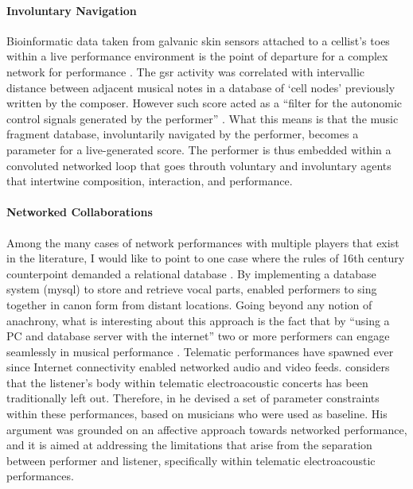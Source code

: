 \paragraph{Involuntary Navigation}
Bioinformatic data taken from galvanic skin sensors attached to a cellist's toes within a live performance environment is the point of departure for a complex network for performance \parencite{icmc/bbp2372.2006.123}. The \gls{gsr} activity was correlated with intervallic distance between adjacent musical notes in a database of `cell nodes' previously written by the composer. However such score acted as a ``filter for the autonomic control signals generated by the performer'' \parencite[601]{icmc/bbp2372.2006.123}. What this means is that the music fragment database, involuntarily navigated by the performer, becomes a parameter for a live-generated score. The performer is thus embedded within a convoluted networked loop that goes throuth voluntary and involuntary agents that intertwine composition, interaction, and performance.

\paragraph{Networked Collaborations}
Among the many cases of network performances with multiple players that exist in the literature, I would like to point to one case where the rules of 16th century counterpoint demanded a relational database \parencite{Nakamoto2007}. By implementing a database system (\gls{mysql}) to store and retrieve vocal parts, \citeauthor{Nakamoto2007} enabled performers to sing together in canon form from distant locations. Going beyond any notion of anachrony, what is interesting about this approach is the fact that by ``using a PC and database server with the internet'' two or more performers can engage seamlessly in musical performance \parencite{Nakamoto2007}. Telematic performances have spawned ever since Internet connectivity enabled networked audio and video feeds. \textcite{icmc/bbp2372.2014.046} considers that the listener's body within telematic electroacoustic concerts has been traditionally left out. Therefore, in he devised a set of parameter constraints within these performances, based on musicians who were used as baseline. His argument was grounded on an affective approach towards networked performance, and it is aimed at addressing the limitations that arise from the separation between performer and listener, specifically within telematic electroacoustic performances.

